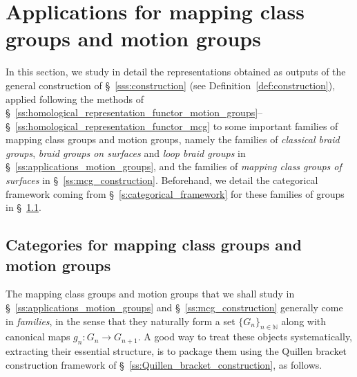 \documentclass[AHL,Unicode,published]{cedram}
\newcommand{\bN}{\mathbb{N}}
\begin{document}
\section{Applications for mapping class groups and motion groups}\label{s:applications}

In this section, we study in detail the representations obtained as outputs of the general construction of \S~\ref{sss:construction} (see Definition~\ref{def:construction}), applied following the methods of \S~\ref{ss:homological_representation_functor_motion_groups}--\S~\ref{ss:homological_representation_functor_mcg} to some important families of mapping class groups and motion groups, namely the families of \emph{classical braid groups}, \emph{braid groups on surfaces} and \emph{loop braid groups} in \S~\ref{ss:applications_motion_groups}, and the families of \emph{mapping class groups of surfaces} in \S~\ref{ss:mcg_construction}. Beforehand, we detail the categorical framework coming from \S~\ref{s:categorical_framework} for these families of groups in \S~\ref{ss:categories_for_families_of_groups}.


\subsection{Categories for mapping class groups and motion groups}\label{ss:categories_for_families_of_groups}

The mapping class groups and motion groups that we shall study in \S~\ref{ss:applications_motion_groups} and \S~\ref{ss:mcg_construction} generally come in \emph{families}, in the sense that they naturally form a set $\{G_{n}\}_{n\in\bN}$ along with canonical maps $g_{n}\colon G_{n}\to G_{n+1}$. A good way to treat these objects systematically, extracting their essential structure, is to package them using the Quillen bracket construction framework of \S~\ref{ss:Quillen_bracket_construction}, as follows.
\end{document}
